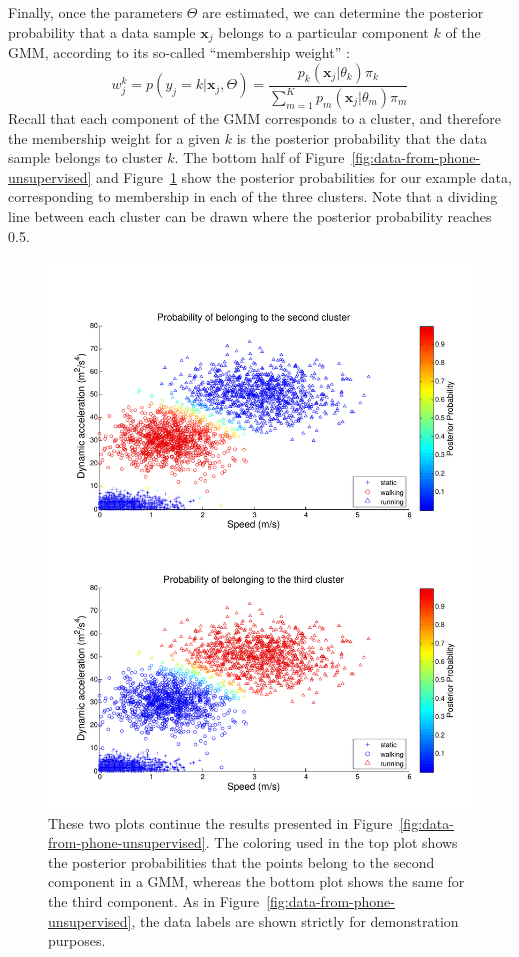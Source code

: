 Finally, once the parameters $\Theta$ are estimated, we can determine the posterior probability that a data sample $\mathbf{x}_j$ belongs to a particular component $k$ of the GMM, according to its so-called ``membership weight'' \cite{Smyth2015}:
%
\begin{equation}
  w_j^k = p(y_j = k|\mathbf{x}_j, \Theta) =  \frac{p_k(\mathbf{x}_j|\theta_k) \pi_k}{ \sum_{m=1}^K p_m(\mathbf{x}_j|\theta_m) \pi_m }
\end{equation}
%
Recall that each component of the GMM corresponds to a cluster, and therefore the membership weight for a given $k$ is the posterior probability that the data sample belongs to cluster $k$. The bottom half of Figure~\ref{fig:data-from-phone-unsupervised} and Figure~\ref{fig:data-from-phone-unsupervised2} show the posterior probabilities for our example data, corresponding to membership in each of the three clusters. Note that a dividing line between each cluster can be drawn where the posterior probability reaches 0.5.
%
\begin{figure}
  \begin{center}
    \includegraphics[width=1.0\textwidth]{Images/figChapter3-3}
  \end{center}
  \caption[Further results from unsupervised learning]{These two plots continue the results presented in Figure~\ref{fig:data-from-phone-unsupervised}. The coloring used in the top plot shows the posterior probabilities that the points belong to the second component in a GMM, whereas the bottom plot shows the same for the third component. As in Figure~\ref{fig:data-from-phone-unsupervised}, the data labels are shown strictly for demonstration purposes.}
  \label{fig:data-from-phone-unsupervised2}
\end{figure}
